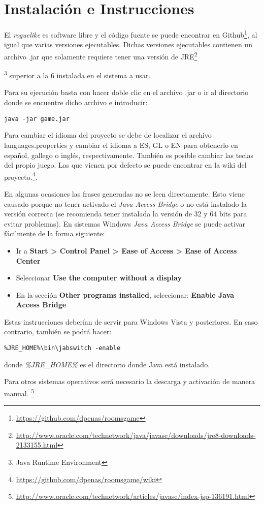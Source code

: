 \chapter{Instalación e Instrucciones}
\label{ref:instalacion}

El \textit{roguelike} es software libre y el código fuente se puede encontrar en Github\footnote{\url{https://github.com/dpenas/roomsgame}}, al igual que varias versiones ejecutables. Dichas versiones ejecutables contienen un archivo .jar que solamente requiere tener una versión de JRE\footnote{\url{http://www.oracle.com/technetwork/java/javase/downloads/jre8-downloads-2133155.html}}{\footnote{Java Runtime Environment} superior a la 6 instalada en el sistema a usar. 

Para su ejecución basta con hacer doble clic en el archivo .jar o ir al directorio donde se encuentre dicho archivo e introducir:

\begin{lstlisting}[label=lst:bash,caption=Comando para la ejecución del videojuego]
java -jar game.jar
\end{lstlisting}

Para cambiar el idioma del proyecto se debe de localizar el archivo languages.properties y cambiar el idioma a ES, GL o EN para obtenerlo en español, gallego o inglés, respectivamente. También es posible cambiar las teclas del propio juego. Las que vienen por defecto se puede encontrar en la wiki del proyecto.\footnote{\url{https://github.com/dpenas/roomsgame/wiki}}.

En algunas ocasiones las frases generadas no se leen directamente. Esto viene causado porque no tener activado el \textit{Java Access Bridge} o no está instalado la versión correcta (se recomienda tener instalada la versión de 32 y 64 bits para evitar problemas). 
En sistemas Windows \textit{Java Access Bridge} se puede activar fácilmente de la forma siguiente:

\begin{itemize}
\item Ir a \textbf{Start > Control Panel > Ease of Access > Ease of Access Center}
\item Seleccionar \textbf{Use the computer without a display}
\item En la sección \textbf{Other programs installed}, seleccionar: \textbf{Enable Java Access Bridge}
\end{itemize}

Estas instrucciones deberían de servir para Windows Vista y posteriores. En caso contrario, también se podrá hacer:

\begin{verbatim}
%JRE_HOME%\bin\jabswitch -enable
\end{verbatim}

donde \textit{\%JRE\_HOME\%} es el directorio donde Java está instalado.

Para otros sistemas operativos será necesario la descarga y activación de manera manual.  \footnote{\url{http://www.oracle.com/technetwork/articles/javase/index-jsp-136191.html}}}